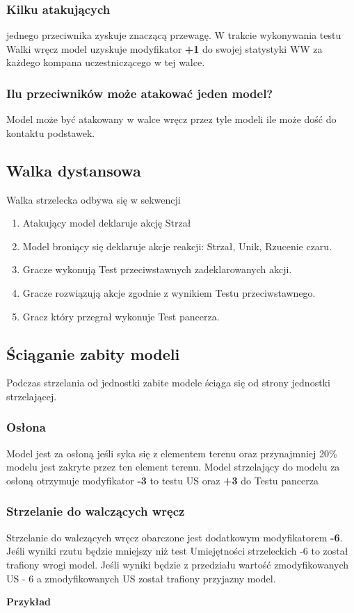 \subsubsection{Kilku atakujących} jednego przeciwnika zyskuje znaczącą przewagę. W trakcie wykonywania testu Walki wręcz model uzyskuje modyfikator \textbf{+1} do swojej statystyki WW za każdego kompana uczestniczącego w tej walce. 

\subsubsection{Ilu przeciwników może atakować jeden model?} Model może być atakowany w walce wręcz przez tyle modeli ile może dość do kontaktu podstawek. 

\subsection{Walka dystansowa}
Walka strzelecka odbywa się w sekwencji
\begin{enumerate}
    \item Atakujący model deklaruje akcję Strzał
    \item Model broniący się deklaruje akcje reakcji: Strzał, Unik, Rzucenie czaru. 
    \item Gracze wykonują Test przeciwstawnych zadeklarowanych akcji.
    \item Gracze rozwiązują akcje zgodnie z wynikiem Testu przeciwstawnego. 
    \item Gracz który przegrał wykonuje Test pancerza.
\end{enumerate}

\subsection{Ściąganie zabity modeli}
Podczas strzelania od jednostki zabite modele ściąga się od strony jednostki strzelającej. 

\subsubsection{Osłona}
Model jest za osłoną jeśli syka się z elementem terenu oraz przynajmniej 20\% modelu jest zakryte przez ten element terenu. Model strzelający do modelu za osłoną otrzymuje modyfikator \textbf{-3} to testu US oraz \textbf{+3} do Testu pancerza

\subsubsection{Strzelanie do walczących wręcz}
Strzelanie do walczących wręcz obarczone jest dodatkowym modyfikatorem \textbf{-6}. Jeśli wyniki rzutu będzie mniejszy niż test Umiejętności strzeleckich -6 to został trafiony wrogi model. Jeśli wyniki będzie z przedziału wartość zmodyfikowanych US - 6 a zmodyfikowanych US został trafiony przyjazny model. 

\textbf{Przykład}